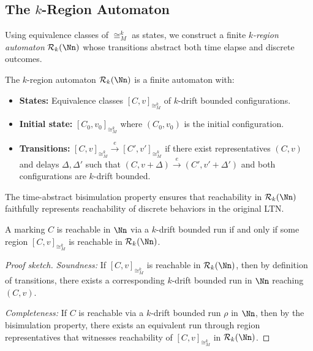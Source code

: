 \subsection{The $k$-Region Automaton}
\label{sec:k-automaton}

Using equivalence classes of $\cong_M^k$ as states, we construct a finite \emph{$k$-region automaton} $\mathcal{R}_k(\Nn)$ whose transitions abstract both time elapse and discrete outcomes.

\begin{definition}
The $k$-region automaton $\mathcal{R}_k(\Nn)$ is a finite automaton with:
\begin{itemize}
\item \textbf{States:} Equivalence classes $[C,v]_{\cong_M^k}$ of $k$-drift bounded configurations.
\item \textbf{Initial state:} $[C_0, v_0]_{\cong_M^k}$ where $(C_0, v_0)$ is the initial configuration.
\item \textbf{Transitions:} $[C,v]_{\cong_M^k} \xrightarrow{e} [C',v']_{\cong_M^k}$ if there exist representatives $(C,v)$ and delays $\Delta, \Delta'$ such that $(C, v + \Delta) \xrightarrow{e} (C', v' + \Delta')$ and both configurations are $k$-drift bounded.
\end{itemize}
\end{definition}

The time-abstract bisimulation property ensures that reachability in $\mathcal{R}_k(\Nn)$ faithfully represents reachability of discrete behaviors in the original LTN.

\begin{theorem}
\label{thm:region-automaton-correct}
A marking $C$ is reachable in $\Nn$ via a $k$-drift bounded run if and only if some region $[C,v]_{\cong_M^k}$ is reachable in $\mathcal{R}_k(\Nn)$.
\end{theorem}

\begin{proof}[Proof sketch]
\emph{Soundness:} If $[C,v]_{\cong_M^k}$ is reachable in $\mathcal{R}_k(\Nn)$, then by definition of transitions, there exists a corresponding $k$-drift bounded run in $\Nn$ reaching $(C,v)$.

\emph{Completeness:} If $C$ is reachable via a $k$-drift bounded run $\rho$ in $\Nn$, then by the bisimulation property, there exists an equivalent run through region representatives that witnesses reachability of $[C,v]_{\cong_M^k}$ in $\mathcal{R}_k(\Nn)$.
\end{proof}

